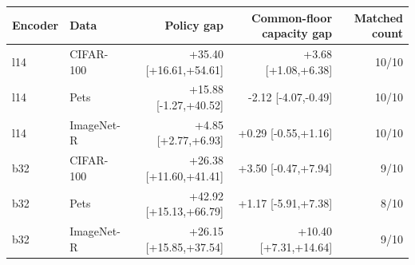 \begin{tabular}{@{}llrrr@{}}
\toprule
Encoder & Data & Policy gap & Common-floor capacity gap & Matched count \\
\midrule
l14 & CIFAR-100 & +35.40 [+16.61,+54.61] & +3.68 [+1.08,+6.38] & 10/10 \\
l14 & Pets & +15.88 [-1.27,+40.52] & -2.12 [-4.07,-0.49] & 10/10 \\
l14 & ImageNet-R & +4.85 [+2.77,+6.93] & +0.29 [-0.55,+1.16] & 10/10 \\
b32 & CIFAR-100 & +26.38 [+11.60,+41.41] & +3.50 [-0.47,+7.94] & 9/10 \\
b32 & Pets & +42.92 [+15.13,+66.79] & +1.17 [-5.91,+7.38] & 8/10 \\
b32 & ImageNet-R & +26.15 [+15.85,+37.54] & +10.40 [+7.31,+14.64] & 9/10 \\
\bottomrule
\end{tabular}
